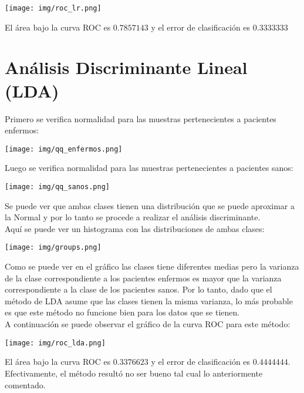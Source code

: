 \documentclass{article}
\begin{document}
\begin{center}
    \texttt{[image: img/roc\_lr.png]}
\end{center}

\noindent
El área bajo la curva ROC es $0.7857143$ y el error de clasificación es $0.3333333$\\


\section{Análisis Discriminante Lineal (LDA)}
Primero se verifica normalidad para las muestras pertenecientes a pacientes enfermos:
\begin{center}
    \texttt{[image: img/qq\_enfermos.png]}
\end{center}

\noindent
Luego se verifica normalidad para las muestras pertenecientes a pacientes sanos:
\begin{center}
    \texttt{[image: img/qq\_sanos.png]}
\end{center}

\noindent
Se puede ver que ambas clases tienen una distribución que se puede aproximar a la Normal y por lo tanto se procede a realizar el análisis discriminante.\\

\noindent
Aquí se puede ver un histograma con las distribuciones de ambas clases:
\begin{center}
    \texttt{[image: img/groups.png]}
\end{center}

\noindent
Como se puede ver en el gráfico las clases tiene diferentes medias pero la varianza de la clase correspondiente a los pacientes enfermos es mayor que la varianza correspondiente a la clase de los pacientes sanos. Por lo tanto, dado que el método de LDA asume que las clases tienen la misma varianza, lo más probable es que este método no funcione bien para los datos que se tienen.\\

\noindent
A continuación se puede observar el gráfico de la curva ROC para este método:\\
\begin{center}
    \texttt{[image: img/roc\_lda.png]}
\end{center}

\noindent
El área bajo la curva ROC es $0.3376623$ y el error de clasificación es $0.4444444$. Efectivamente, el método resultó no ser bueno tal cual lo anteriormente comentado.
\end{document}
